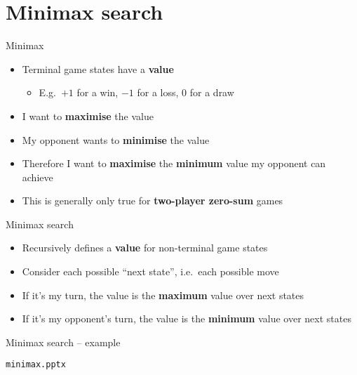 \part{Minimax search}
\frame{\partpage}

\begin{frame}{Minimax}
	\begin{itemize}
		\pause\item Terminal game states have a \textbf{value}
			\begin{itemize}
				\pause\item E.g.\ $+1$ for a win, $-1$ for a loss, $0$ for a draw
			\end{itemize}
		\pause\item I want to \textbf{maximise} the value
		\pause\item My opponent wants to \textbf{minimise} the value
		\pause\item Therefore I want to \textbf{maximise} the \textbf{minimum} value my opponent can achieve
		\pause\item This is generally only true for \textbf{two-player zero-sum} games
	\end{itemize}
\end{frame}

\begin{frame}{Minimax search}
	\begin{itemize}
		\pause\item Recursively defines a \textbf{value} for non-terminal game states
		\pause\item Consider each possible ``next state'', i.e.\ each possible move
		\pause\item If it's my turn, the value is the \textbf{maximum} value over next states
		\pause\item If it's my opponent's turn, the value is the \textbf{minimum} value over next states
	\end{itemize}
\end{frame}

\begin{frame}{Minimax search -- example}
	\begin{center}
		\texttt{minimax.pptx}
	\end{center}
\end{frame}

